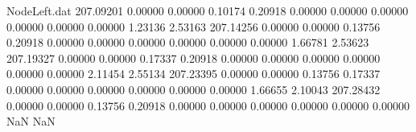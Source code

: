 \begin{filecontents}{NodeLeft.dat}
 207.09201    0.00000    0.00000     0.10174    0.20918    0.00000    0.00000    0.00000    0.00000    0.00000    0.00000    1.23136    2.53163
 207.14256    0.00000    0.00000     0.13756    0.20918    0.00000    0.00000    0.00000    0.00000    0.00000    0.00000    1.66781    2.53623
 207.19327    0.00000    0.00000     0.17337    0.20918    0.00000    0.00000    0.00000    0.00000    0.00000    0.00000    2.11454    2.55134
 207.23395    0.00000    0.00000     0.13756    0.17337    0.00000    0.00000    0.00000    0.00000    0.00000    0.00000    1.66655    2.10043
 207.28432    0.00000    0.00000     0.13756    0.20918    0.00000    0.00000    0.00000    0.00000    0.00000    0.00000        NaN        NaN
\end{filecontents}
